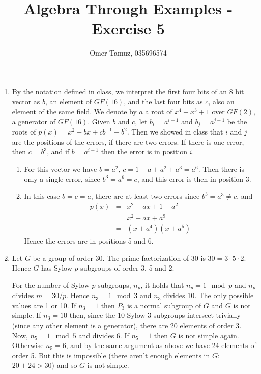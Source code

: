 \documentclass[11pt]{article} \usepackage{amssymb}
\begin{document}
\title{Algebra Through Examples - Exercise 5}

 \author{Omer Tamuz, 035696574}
\maketitle


\begin{enumerate}
\item 
  By the notation defined in class, we interpret the first four bits of
  an 8 bit vector as $b$, an element of $GF(16)$, and the last four
  bits as $c$, also an element of the same field. We denote by $a$ a root of
  $x^4+x^3+1$ over $GF(2)$, a generator
  of $GF(16)$. Given $b$ and $c$, let $b_i=a^{i-1}$ and $b_j=a^{j-1}$ be the 
  roots of
  $p(x)=x^2+bx+cb^{-1}+b^2$. Then we showed in class that $i$ and $j$ are the 
  positions of the errors, if there are two errors. If there is one error, then
  $c=b^3$, and if $b=a^{i-1}$ then the error is in position $i$. 
  \begin{enumerate}
  \item 
    For this vector we have $b=a^2$, $c=1+a+a^2+a^3=a^6$. Then there is only 
    a single error, since $b^3= a^6=c$, and this error is then in position 3.
  \item
    In this case $b=c=a$, there are at least two errors since 
    $b^3=a^3\neq c$, and
    \begin{eqnarray*}
      p(x)&=& x^2+ax+1+a^2
      \\ &=&  x^2+ax+a^9
      \\ &=& (x+a^4)(x+a^5)
    \end{eqnarray*}
    Hence the errors are in positions 5 and 6.
  \end{enumerate}
\item
  Let $G$ be a group of order 30. The prime factorization of 30 is 
  $30=3 \cdot 5 \cdot 2$. 
  Hence $G$ has Sylow $p$-subgroups of order 3, 5 and 2. 

  For the number of Sylow $p$-subgroups, $n_p$, it holds that $n_p=1\mod p$ and
  $n_p$ divides $m=30/p$. Hence $n_3=1 \mod 3$ and $n_3$ divides 10. The only
  possible values are 1 or 10. If $n_3=1$ then $P_3$ is a normal subgroup 
  of $G$ and $G$ is not simple. If $n_3=10$ then, since the 10 Sylow 3-subgroups
  intersect trivially (since any other element is a generator), there
  are 20 elements of order 3. Now, $n_5=1\mod 5$ and divides 6. If $n_5=1$ then
  $G$ is not simple again. Otherwise $n_5=6$, and by the same argument as above
  we have 24 elements of order 5. But this is impossible (there aren't enough
  elements in $G$: $20+24>30$) and so $G$ is not simple.


\end{enumerate}
\end{document}
